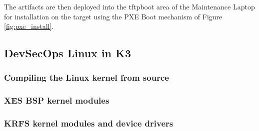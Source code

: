 \documentclass[12pt]{article}
\begin{document}
\begin{table}[H]
    \captionsetup{width=0.9\linewidth}
    \caption{Artifacts created with RedHawk Architect}
    \label{tab:architect_artifacts}
\end{table}

The artifacts are then deployed into the tftpboot area of the Maintenance
Laptop for installation on the target using the PXE Boot mechanism of Figure
\ref{fig:pxe_install}.


%
\subsection{DevSecOps Linux in K3}

\subsubsection{Compiling the Linux kernel from source}

\subsubsection{XES BSP kernel modules}

\subsubsection{KRFS kernel modules and device drivers}
\end{document}
